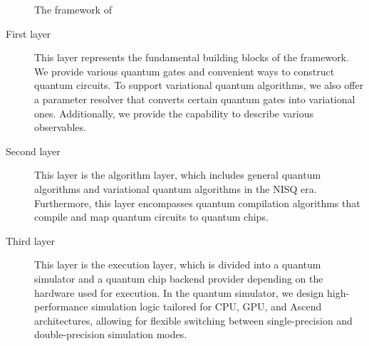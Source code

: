 \begin{figure*}
    \caption{The framework of \MindQuantum}
    \label{fig:framework}
\end{figure*}


\begin{description}
    \item[First layer] This layer represents the fundamental building blocks of the framework. We provide various quantum gates and convenient ways to construct quantum circuits. To support variational quantum algorithms, we also offer a parameter resolver that converts certain quantum gates into variational ones. Additionally, we provide the capability to describe various observables.
    \item[Second layer] This layer is the algorithm layer, which includes general quantum algorithms and variational quantum algorithms in the NISQ era. Furthermore, this layer encompasses quantum compilation algorithms that compile and map quantum circuits to quantum chips.
    \item[Third layer] This layer is the execution layer, which is divided into a quantum simulator and a quantum chip backend provider depending on the hardware used for execution. In the quantum simulator, we design high-performance simulation logic tailored for CPU, GPU, and Ascend architectures, allowing for flexible switching between single-precision and double-precision simulation modes.
\end{description}

